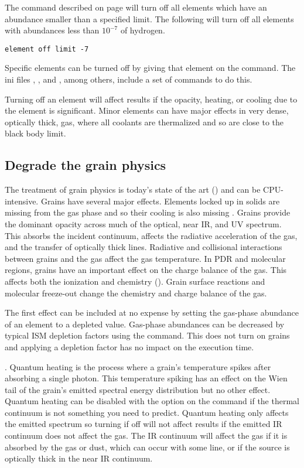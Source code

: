 The  command described on page 
\pageref{sec:ElementLimitOffCommand}
will turn off all elements which have an
abundance smaller than a specified limit.
The following will turn off all elements with abundances less than $10^{-7}$ of hydrogen.
\begin{verbatim}
element off limit -7
\end{verbatim}

Specific elements can be turned off by giving that element on the   command.
The ini files ,
, and ,
among others,
include a set of  commands to do this.

Turning off an element will affect results if the opacity,
heating, or cooling
due to the element is significant.
Minor elements can have major effects
in very dense, optically thick, gas, where all coolants are thermalized and so are close to the
black body limit.

\subsection{Degrade the grain physics}

The treatment of grain physics is today's state of the art
(\citealp{VanHoof2001, VanHoof2004}) and can be CPU-intensive.
Grains have several major effects.
Elements locked up in solids are missing from the gas phase and so their
cooling is also missing \citep{KingdonFerlandFeibelman1995}.
Grains provide the dominant opacity across much
of the optical, near IR, and UV spectrum.
This absorbs the incident
continuum, affects the radiative acceleration of the gas, and the transfer
of optically thick lines.
Radiative and collisional interactions between
grains and the gas affect the gas temperature.
In PDR and molecular regions,
grains have an important effect on the charge balance of the gas.
This
affects both the ionization and chemistry (\citealp{Abel2005}).
Grain surface
reactions and molecular freeze-out change the chemistry and charge balance
of the gas.

The first effect can be included at no expense by setting the gas-phase
abundance of an element to a depleted value.
Gas-phase abundances can be
decreased by typical ISM depletion factors using the
 command.
This does not turn on grains and applying a depletion
factor has no impact on the execution time.

.  Quantum heating
is the process where a grain's
temperature spikes after absorbing a single photon.
This temperature spiking
has an effect on the Wien tail of the grain's emitted spectral energy
distribution but no other effect.
Quantum heating can be disabled with
the  option on the  command if the thermal continuum is not
something you need to predict.
Quantum heating only affects the emitted
spectrum so turning if off will not affect results if the emitted IR
continuum does not affect the gas.
The IR continuum will affect the gas
if it is absorbed by the gas or dust, which can occur with some line, or
if the source is optically thick in the near IR continuum.

